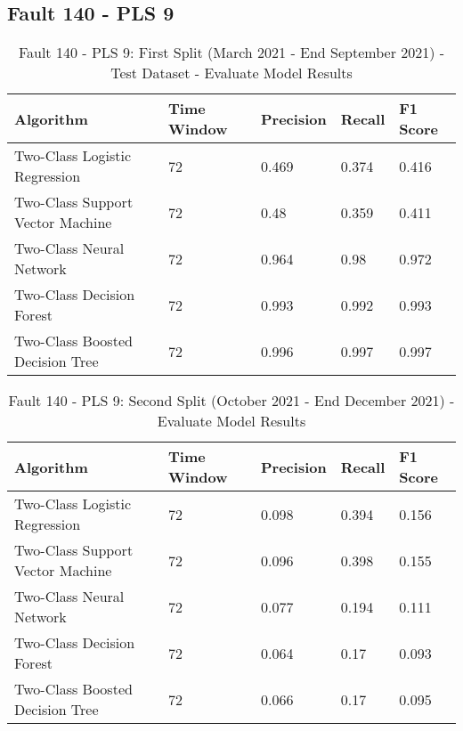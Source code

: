 \subsection{Fault 140 - PLS 9}

\begin{table}[!ht]
    \centering
    \begin{tabular}{|l|l|l|l|l|}
    \hline
        Algorithm & Time Window & Precision & Recall & F1 Score \\ \hline
        Two-Class Logistic Regression & 72 & 0.469 & 0.374 & 0.416 \\ \hline
        Two-Class Support Vector Machine & 72 & 0.48 & 0.359 & 0.411 \\ \hline
        Two-Class Neural Network & 72 & 0.964 & 0.98 & 0.972 \\ \hline
        Two-Class Decision Forest & 72 & 0.993 & 0.992 & 0.993 \\ \hline
        Two-Class Boosted Decision Tree & 72 & 0.996 & 0.997 & 0.997 \\ \hline
    \end{tabular}
    \caption{Fault 140 - PLS 9: First Split (March 2021 - End September 2021) - Test Dataset - Evaluate Model Results}
    \label{9112_SCA34_1st}
\end{table}

\begin{table}[!ht]
    \centering
    \begin{tabular}{|l|l|l|l|l|}
    \hline
        Algorithm & Time Window & Precision & Recall & F1 Score \\ \hline
        Two-Class Logistic Regression & 72 & 0.098 & 0.394 & 0.156 \\ \hline
        Two-Class Support Vector Machine & 72 & 0.096 & 0.398 & 0.155 \\ \hline
        Two-Class Neural Network & 72 & 0.077 & 0.194 & 0.111 \\ \hline
        Two-Class Decision Forest & 72 & 0.064 & 0.17 & 0.093 \\ \hline
        Two-Class Boosted Decision Tree & 72 & 0.066 & 0.17 & 0.095 \\ \hline
    \end{tabular}
    \caption{Fault 140 - PLS 9: Second Split (October 2021 - End December 2021) - Evaluate Model Results}
    \label{9112_SCA34_1st}
\end{table}

